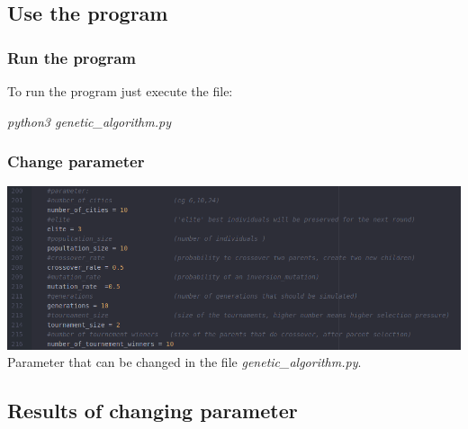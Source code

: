 \documentclass[10pt,a4paper]{article}
\begin{document}
	\subsection{Use the program}
	\subsubsection{Run the program}
	To run the program just execute the file: 
	\begin{center}
		\textit{python3 genetic\_algorithm.py}
	\end{center}
	\subsubsection{Change parameter}
	\begin{center}
		\includegraphics[width=1\linewidth]{pictures/geneticAlgorithm/parameter}
	\\
	Parameter that can be changed in the file \textit{genetic\_algorithm.py}.
	\\	
	\end{center}
	
	\subsection{Results of changing parameter}
\end{document}
